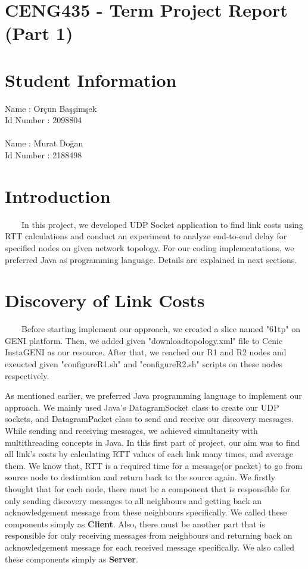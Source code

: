 \documentclass[12pt]{article}
\begin{document}
\section*{CENG435 - Term Project Report (Part 1) } 

\section*{Student Information }

Name : Orçun Başşimşek \\
Id Number : 2098804 \\
\\
Name : Murat Doğan \\
Id Number : 2188498 \\

\section{Introduction}

\ \ \ \ In this project, we developed UDP Socket application to find link costs using RTT calculations and conduct an experiment to analyze end-to-end delay for specified nodes on given network topology. For our coding implementations, we preferred Java as programming language. Details are explained in next sections.

\section{Discovery of Link Costs}

\ \ \ \ Before starting implement our approach, we created a slice named "61tp" on GENI platform. Then, we added given "download\textunderscore topology.xml" file to Cenic InstaGENI as our resource. After that, we reached our R1 and R2 nodes and exeucted given "configureR1.sh" and "configureR2.sh" scripts on these nodes respectively.

As mentioned earlier, we preferred Java programming language to implement our approach. We mainly used Java's DatagramSocket class to create our UDP sockets, and DatagramPacket class to send and receive our discovery messages. While sending and receiving messages, we achieved simultaneity with multithreading concepts in Java. In this first part of project, our aim was to find all link's costs by calculating RTT values of each link many times, and average them. We know that, RTT is a required time for a message(or packet) to go from source node to destination and return back to the source again. We firstly thought that for each node, there must be a component that is responsible for only sending discovery messages to all neighbours and getting back an acknowledgement message from these neighbours specifically. We called these components simply as \textbf{Client}. Also, there must be another part that is responsible for only receiving messages from neighbours and returning back an acknowledgement message for each received message specifically. We also called these components simply as \textbf{Server}.
\end{document}
